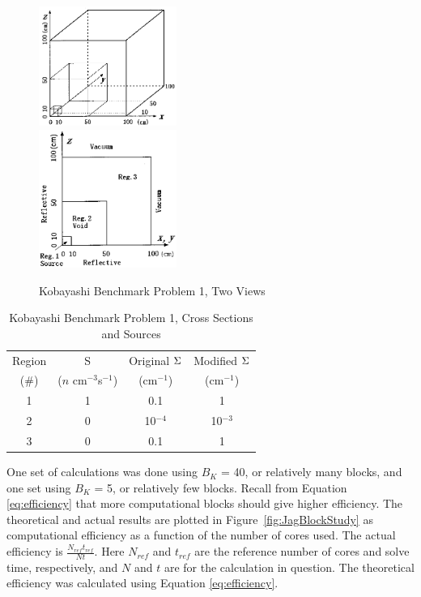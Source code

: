 \begin{figure}[!ht]	
  \begin{center}
    \includegraphics [width=0.4\textwidth, height=0.3\textheight ] {Kobayashi1} \\
    \includegraphics [width=0.4\textwidth, height=0.3\textheight ] {Kobayashi1Front}
  \end{center}
  \caption{Kobayashi Benchmark Problem 1, Two Views}
  \label{fig:Kob1}
\end{figure}

\begin{table}[h]
  \caption{Kobayashi Benchmark Problem 1, Cross Sections and Sources}
  \centering
  \begin{tabular}{|c|c|c|c|}
    \hline
    Region & S & Original $\Sigma$ & Modified $\Sigma$ \\
    (\#) & ($n$ cm$^{-3}$s$^{-1}$) & (cm$^{-1}$) & (cm$^{-1}$) \\
    \hline
    1 & 1 & 0.1 & 1 \\
    2 & 0 & 10$^{-4}$ & 10$^{-3}$ \\
    3 & 0 & 0.1 & 1 \\
    \hline
  \end{tabular}
  \label{tab:Kob1xsecs}
\end{table}

One set of calculations was done using $B_{K}$ = 40, or relatively many blocks, and one set using $B_{K}$ = 5, or relatively few blocks. Recall from Equation \eqref{eq:efficiency} that more computational blocks should give higher efficiency. The theoretical and actual results are plotted in Figure~\ref{fig:JagBlockStudy} as computational efficiency as a function of the number of cores used. The actual efficiency is $\frac{N_{ref}t_{ref}}{Nt}$. Here $N_{ref}$ and $t_{ref}$ are the reference number of cores and solve time, respectively, and $N$ and $t$ are for the calculation in question.  The theoretical efficiency was calculated using Equation \eqref{eq:efficiency}.

